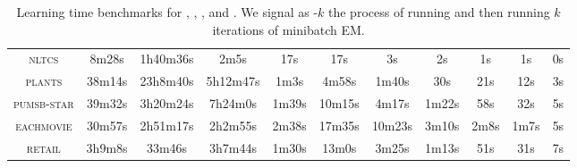 \begin{sidewaystable}[ph!]
{\begin{tabular}{c|cccc|cccccc}
    \textsc{nltcs} & 8m28s & 1h40m36s & 2m5s & 17s & 17s & 3s & 2s & 1s & 1s & 0s\\
    \textsc{plants} & 38m14s & 23h8m40s & 5h12m47s & 1m3s & 4m58s & 1m40s & 30s & 21s & 12s & 3s\\
    \textsc{pumsb-star} & 39m32s & 3h20m24s & 7h24m0s & 1m39s & 10m15s & 4m17s & 1m22s & 58s & 32s & 5s\\
    \textsc{eachmovie} & 30m57s & 2h51m17s & 2h2m55s & 2m38s & 17m35s & 10m23s & 3m10s & 2m8s & 1m7s & 5s\\
    \textsc{retail} & 3h9m8s & 33m46s & 3h7m44s & 1m30s & 13m0s & 3m25s & 1m13s & 51s & 31s & 7s\\
    \hline
  \end{tabular}
  }
  \caption{Learning time benchmarks for , ,
    ,  and . We signal as
    -$k$ the process of running  and then running $k$
    iterations of minibatch EM.}
  \label{tab:bintime}
\end{sidewaystable}

